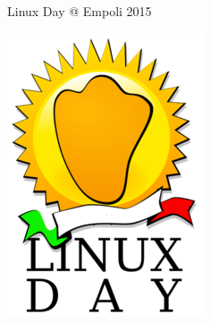 \documentclass{beamer}
\begin{document}
\begin{frame}
\begin{block}{Linux Day @ Empoli 2015}
\begin{minipage}{.1\linewidth}
      \includegraphics[width=.9\linewidth]{img/linuxday-logo.png}
    \end{minipage}
  \end{block}

\end{frame}
\end{document}
